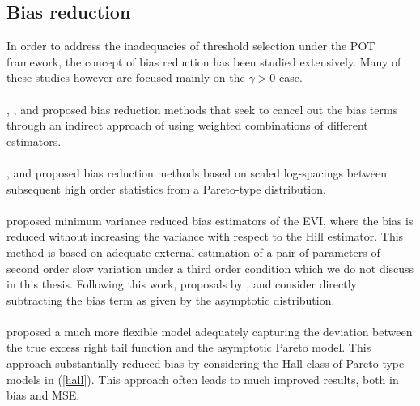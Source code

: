 \subsection{Bias reduction}
In order to address the inadequacies of threshold selection under the POT framework, the concept of bias reduction has been studied extensively. Many of these studies however are focused mainly on the $\gamma>0$ case.
\\\\
\cite{peng1998asymptotically}, \cite{caeiro2002class}, \citet{gomesa2002asymptotically,gomes2004bias} and \citet{gomes2002semi,gomes2005revisiting} proposed bias reduction methods that seek to cancel out the bias terms through an indirect approach of using weighted combinations of different estimators.
\\\\
\citet{beirlant1999tail, beirlant2008improved}, \citet{feuerverger1999estimating} and \citet{gomes2000alternatives,gomes2007improving} proposed bias reduction methods based on scaled log-spacings between subsequent high order statistics from a Pareto-type distribution.
\\\\
\cite{caeiro2005direct} proposed minimum variance reduced bias estimators of the EVI, where the bias is reduced without increasing the variance with respect to the Hill estimator. This method is based on adequate external estimation of a pair of parameters of second order slow variation under a third order condition which we do not discuss in this thesis. Following this work, proposals by \cite{gomes2007sturdy,ivette2007simple}, \cite{gomes2008tail} and \citet{caeiro2008minimum} consider directly subtracting the bias term as given by the asymptotic distribution.
\\\\
\cite{beirlant2009second} proposed a much more flexible model adequately capturing the deviation between the true excess right tail function and the asymptotic Pareto model. This approach substantially reduced bias by considering the Hall-class of Pareto-type models in (\ref{hall}). This approach often leads to much improved results, both in bias and MSE.

\\
